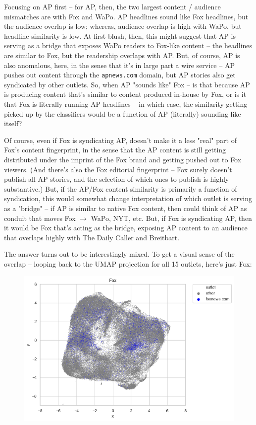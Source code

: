 \documentclass{scrartcl}
\begin{document}
Focusing on AP first -- for AP, then, the two largest content / audience mismatches are with Fox and WaPo. AP headlines sound like Fox headlines, but the audience overlap is low; whereas, audience overlap is high with WaPo, but headline similarity is low. At first blush, then, this might suggest that AP is serving as a bridge that exposes WaPo readers to Fox-like content -- the headlines are similar to Fox, but the readership overlaps with AP. But, of course, AP is also anomalous, here, in the sense that it's in large part a wire service -- AP pushes out content through the \texttt{apnews.com} domain, but AP stories also get syndicated by other outlets. So, when AP "sounds like" Fox -- is that because AP is producing content that's similar to content produced in-house by Fox, or is it that Fox is literally running AP headlines -- in which case, the similarity getting picked up by the classifiers would be a function of AP (literally) sounding like itself?

Of course, even if Fox is syndicating AP, doesn't make it a less "real" part of Fox's content fingerprint, in the sense that the AP content is still getting distributed under the imprint of the Fox brand and getting pushed out to Fox viewers. (And there's also the Fox editorial fingerprint -- Fox surely doesn't publish all AP stories, and the selection of which ones to publish is highly substantive.) But, if the AP/Fox content similarity is primarily a function of syndication, this would somewhat change interpretation of which outlet is serving as a "bridge" -- if AP is similar to native Fox content, then could think of AP as conduit that moves Fox $\rightarrow$ WaPo, NYT, etc. But, if Fox is syndicating AP, then it would be Fox that's acting as the bridge, exposing AP content to an audience that overlaps highly with The Daily Caller and Breitbart.

The answer turns out to be interestingly mixed. To get a visual sense of the overlap -- looping back to the UMAP projection for all 15 outlets, here's just Fox:

\begin{figure}[H]
  \centering
  \includegraphics[height=0.4\textheight]{figures/fox-umap.png}
\end{figure}
\end{document}
